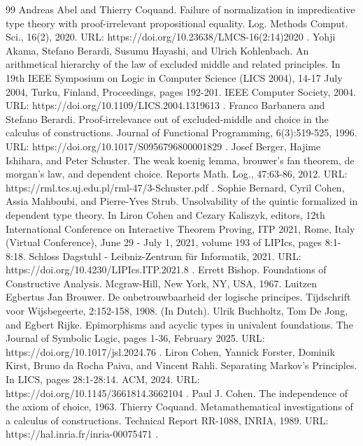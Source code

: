 \documentclass[10pt,a4paper]{amsart}
\begin{document}
\begin{thebibliography}{99}
 Andreas Abel and Thierry Coquand. Failure of normalization in impredicative type theory with proof-irrelevant propositional equality. Log. Methods Comput. Sci., 16(2), 2020. URL: https://doi.org/10.23638/LMCS-16(2:14)2020 .
 Yohji Akama, Stefano Berardi, Susumu Hayashi, and Ulrich Kohlenbach. An arithmetical hierarchy of the law of excluded middle and related principles. In 19th IEEE Symposium on Logic in Computer Science (LICS 2004), 14-17 July 2004, Turku, Finland, Proceedings, pages 192-201. IEEE Computer Society, 2004. URL: https://doi.org/10.1109/LICS.2004.1319613 .
 Franco Barbanera and Stefano Berardi. Proof-irrelevance out of excluded-middle and choice in the calculus of constructions. Journal of Functional Programming, 6(3):519-525, 1996. URL: https://doi.org/10.1017/S0956796800001829 .
 Josef Berger, Hajime Ishihara, and Peter Schuster. The weak koenig lemma, brouwer’s fan theorem, de morgan’s law, and dependent choice. Reports Math. Log., 47:63-86, 2012. URL: https://rml.tcs.uj.edu.pl/rml-47/3-Schuster.pdf .
 Sophie Bernard, Cyril Cohen, Assia Mahboubi, and Pierre-Yves Strub. Unsolvability of the quintic formalized in dependent type theory. In Liron Cohen and Cezary Kaliszyk, editors, 12th International Conference on Interactive Theorem Proving, ITP 2021, Rome, Italy (Virtual Conference), June 29 - July 1, 2021, volume 193 of LIPIcs, pages 8:1-8:18. Schloss Dagstuhl - Leibniz-Zentrum für Informatik, 2021. URL: https://doi.org/10.4230/LIPIcs.ITP.2021.8 .
 Errett Bishop. Foundations of Constructive Analysis. Mcgraw-Hill, New York, NY, USA, 1967.
 Luitzen Egbertus Jan Brouwer. De onbetrouwbaarheid der logische principes. Tijdschrift voor Wijsbegeerte, 2:152-158, 1908. (In Dutch).
 Ulrik Buchholtz, Tom De Jong, and Egbert Rijke. Epimorphisms and acyclic types in univalent foundations. The Journal of Symbolic Logic, pages 1-36, February 2025. URL: https://doi.org/10.1017/jsl.2024.76 .
 Liron Cohen, Yannick Forster, Dominik Kirst, Bruno da Rocha Paiva, and Vincent Rahli. Separating Markov’s Principles. In LICS, pages 28:1-28:14. ACM, 2024. URL: https://doi.org/10.1145/3661814.3662104 .
 Paul J. Cohen. The independence of the axiom of choice, 1963.
 Thierry Coquand. Metamathematical investigations of a calculus of constructions. Technical Report RR-1088, INRIA, 1989. URL: https://hal.inria.fr/inria-00075471 .

\end{thebibliography}
\end{document}
